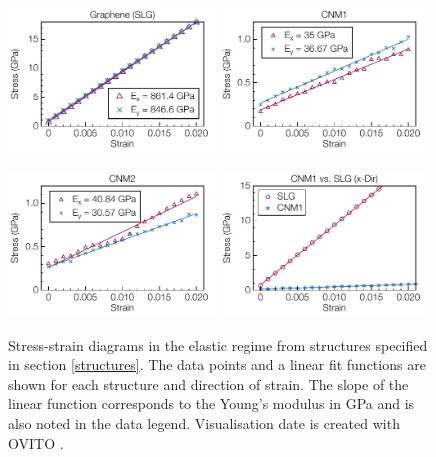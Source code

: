 \documentclass[preprint,12pt]{elsarticle}
\begin{document}
\begin{figure}[ht!]
\centering
%
\includegraphics[width=0.49\textwidth]{YM4CNM-f-5a.pdf}
\includegraphics[width=0.49\textwidth]{YM4CNM-f-5b.pdf}

\includegraphics[width=0.49\textwidth]{YM4CNM-f-5c.pdf}
\includegraphics[width=0.49\textwidth]{YM4CNM-f-5d.pdf}
\caption{Stress-strain diagrams in the elastic regime from structures specified in section \ref{structures}. 
The data points and a linear fit functions are shown for each structure and direction of strain. 
The slope of the linear function corresponds to the Young's modulus 
in GPa and is also noted in the data legend. 
Visualisation date is created with OVITO \cite{ovito}. \label{Ziehen_data}}
\end{figure}
\end{document}
